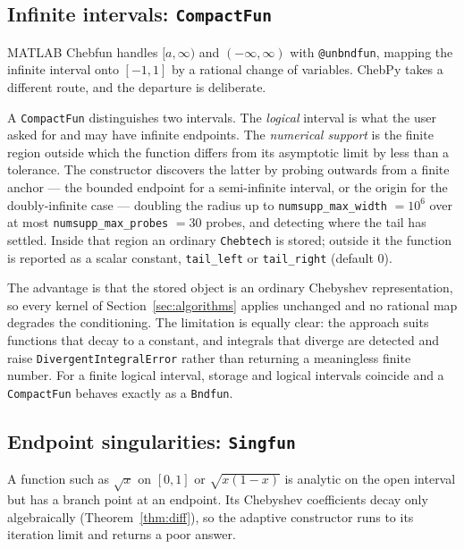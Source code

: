 \documentclass[11pt,a4paper]{article}
\newcommand{\code}[1]{\texttt{#1}}
\begin{document}
\subsection{Infinite intervals: \texttt{CompactFun}}
\label{sec:compact}

MATLAB Chebfun handles $[a,\infty)$ and $(-\infty,\infty)$ with
\code{@unbndfun}, mapping the infinite interval onto $[-1,1]$ by a rational
change of variables. ChebPy takes a different route, and the departure is
deliberate.

A \code{CompactFun} distinguishes two intervals. The \emph{logical} interval is
what the user asked for and may have infinite endpoints. The \emph{numerical
support} is the finite region outside which the function differs from its
asymptotic limit by less than a tolerance. The constructor discovers the latter
by probing outwards from a finite anchor --- the bounded endpoint for a
semi-infinite interval, or the origin for the doubly-infinite case --- doubling
the radius up to \code{numsupp\_max\_width} $= 10^6$ over at most
\code{numsupp\_max\_probes} $= 30$ probes, and detecting where the tail has
settled. Inside that region an ordinary \code{Chebtech} is stored; outside it
the function is reported as a scalar constant, \code{tail\_left} or
\code{tail\_right} (default $0$).

The advantage is that the stored object is an ordinary Chebyshev
representation, so every kernel of Section~\ref{sec:algorithms} applies
unchanged and no rational map degrades the conditioning. The limitation is
equally clear: the approach suits functions that decay to a constant, and
integrals that diverge are detected and raise
\code{DivergentIntegralError} rather than returning a meaningless finite
number. For a finite logical interval, storage and logical intervals coincide
and a \code{CompactFun} behaves exactly as a \code{Bndfun}.

\subsection{Endpoint singularities: \texttt{Singfun}}
\label{sec:singfun}

A function such as $\sqrt{x}$ on $[0,1]$ or $\sqrt{x(1-x)}$ is analytic on the
open interval but has a branch point at an endpoint. Its Chebyshev coefficients
decay only algebraically (Theorem~\ref{thm:diff}), so the adaptive constructor
runs to its iteration limit and returns a poor answer.
\end{document}
